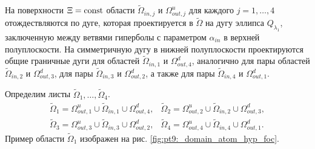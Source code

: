 На поверхности $\Xi = \mathrm{const}$ области $\widetilde{\Omega}_{in, j}$ и $\Omega_{out, j}^u$ для каждого $j=1, \ldots,4$  отождествляются по дуге, которая проектируется в $\widetilde{\Omega}$ на дугу эллипса $Q_{\lambda_1}$, заключенную между ветвями гиперболы с параметром $\alpha_{in}$ в верхней полуплоскости. На симметричную дугу в нижней полуплоскости проектируются общие граничные дуги для областей $\widetilde{\Omega}_{in, 1}$ и $\Omega_{out, 4}^d$, аналогично для пары областей $\widetilde{\Omega}_{in, 2}$ и $\Omega_{out, 3}^d$, для пары $\widetilde{\Omega}_{in, 3}$ и $\Omega_{out, 2}^d$, а также для пары $\widetilde{\Omega}_{in, 4}$ и $\Omega_{out, 1}^d$. 

Определим листы $\widetilde{\Omega}_1, \ldots, \widetilde{\Omega}_4$. 
\begin{equation}
\begin{array}{cc}
\widetilde{\Omega}_1 = \Omega_{out, 1}^u \cup \widetilde{\Omega}_{in, 1} \cup \Omega_{out, 4}^d, &
\widetilde{\Omega}_2 = \Omega_{out, 2}^u \cup \widetilde{\Omega}_{in, 2} \cup \Omega_{out, 3}^d, \\
\widetilde{\Omega}_3 = \Omega_{out, 3}^u \cup \widetilde{\Omega}_{in, 3} \cup \Omega_{out, 2}^d, &
\widetilde{\Omega}_4 = \Omega_{out, 4}^u \cup \widetilde{\Omega}_{in, 4} \cup \Omega_{out, 1}^d.
\end{array}
\label{eq:case5Omegas}
\end{equation}
Пример области $\widetilde{\Omega}_1$ изображен на рис. \ref{fig:pt9:_domain_atom_hyp_foc}.


